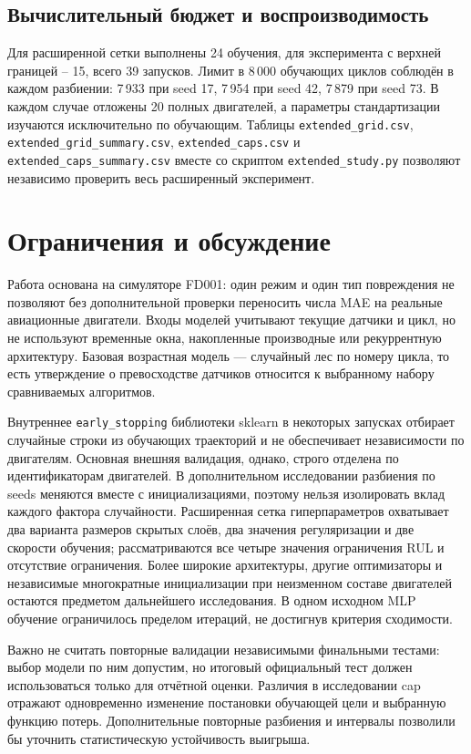 \documentclass[12pt,a4paper]{article}
\begin{document}
\subsection{Вычислительный бюджет и воспроизводимость}
Для расширенной сетки выполнены 24 обучения, для эксперимента с верхней границей -- 15, всего 39 запусков. Лимит в 8\,000 обучающих циклов соблюдён в каждом разбиении: 7\,933 при seed 17, 7\,954 при seed 42, 7\,879 при seed 73. В каждом случае отложены 20 полных двигателей, а параметры стандартизации изучаются исключительно по обучающим. Таблицы \texttt{extended\_grid.csv}, \texttt{extended\_grid\_summary.csv}, \texttt{extended\_caps.csv} и \texttt{extended\_caps\_summary.csv} вместе со скриптом \texttt{extended\_study.py} позволяют независимо проверить весь расширенный эксперимент.

\section{Ограничения и обсуждение}
Работа основана на симуляторе FD001: один режим и один тип повреждения не позволяют без дополнительной проверки переносить числа MAE на реальные авиационные двигатели. Входы моделей учитывают текущие датчики и цикл, но не используют временные окна, накопленные производные или рекуррентную архитектуру. Базовая возрастная модель — случайный лес по номеру цикла, то есть утверждение о превосходстве датчиков относится к выбранному набору сравниваемых алгоритмов.

Внутреннее \texttt{early\_stopping} библиотеки sklearn в некоторых запусках отбирает случайные строки из обучающих траекторий и не обеспечивает независимости по двигателям. Основная внешняя валидация, однако, строго отделена по идентификаторам двигателей. В дополнительном исследовании разбиения по seeds меняются вместе с инициализациями, поэтому нельзя изолировать вклад каждого фактора случайности. Расширенная сетка гиперпараметров охватывает два варианта размеров скрытых слоёв, два значения регуляризации и две скорости обучения; рассматриваются все четыре значения ограничения RUL и отсутствие ограничения. Более широкие архитектуры, другие оптимизаторы и независимые многократные инициализации при неизменном составе двигателей остаются предметом дальнейшего исследования. В одном исходном MLP обучение ограничилось пределом итераций, не достигнув критерия сходимости.

Важно не считать повторные валидации независимыми финальными тестами: выбор модели по ним допустим, но итоговый официальный тест должен использоваться только для отчётной оценки. Различия в исследовании cap отражают одновременно изменение постановки обучающей цели и выбранную функцию потерь. Дополнительные повторные разбиения и интервалы позволили бы уточнить статистическую устойчивость выигрыша.
\end{document}
